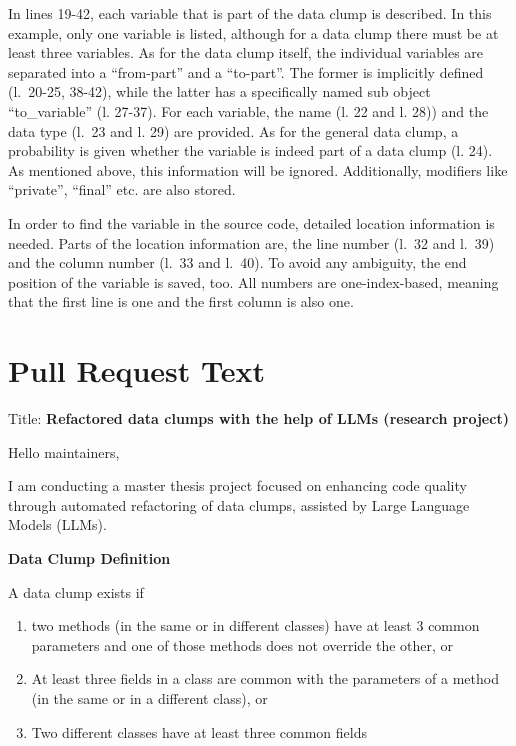 \begin{appendices}
In lines 19-42, each variable that is part of the data clump is described. In this example, only one variable is listed, although for a data clump there must be at least three variables. As for the data clump itself, the individual variables are separated into a \enquote{from-part} and a \enquote{to-part}. The former is implicitly defined (l.~20-25, 38-42), while the latter has a specifically named sub object \enquote{to\_variable} (l. 27-37). For each variable, the name (l. 22 and l. 28)) and the data type (l.~23 and l. 29) are provided. As for the general data clump, a probability is given whether the variable is indeed part of a data clump (l. 24). As mentioned above, this information will be ignored.  Additionally, modifiers like \enquote{private}, \enquote{final} etc. are also stored. 

In order to find the variable in the source code, detailed location information is needed. Parts of the location information are, the line number (l.~32 and l.~39) and the column number (l.~33 and l.~40). To avoid any ambiguity, the end position of the variable is saved, too. All numbers are one-index-based, meaning that the first line is one and the first column is also one. 


\chapter{Pull Request Text} \label{app:pr_text}


Title: \textbf{ Refactored data clumps with the help of LLMs (research project)}


Hello maintainers,

I am conducting a master thesis project focused on enhancing code quality through automated refactoring of data clumps, assisted by Large Language Models (LLMs).\newline


\textbf{Data Clump Definition}
\newline

A data clump exists if
\begin{enumerate}
    \item  two methods (in the same or in different classes) have at least 3 common parameters and one of those methods does not override the other,  or
    \item  At least three fields in a class are common with the parameters of a method (in the same or in a different class), or
    \item  Two different classes have at least three common fields
\end{enumerate}


\end{appendices}
